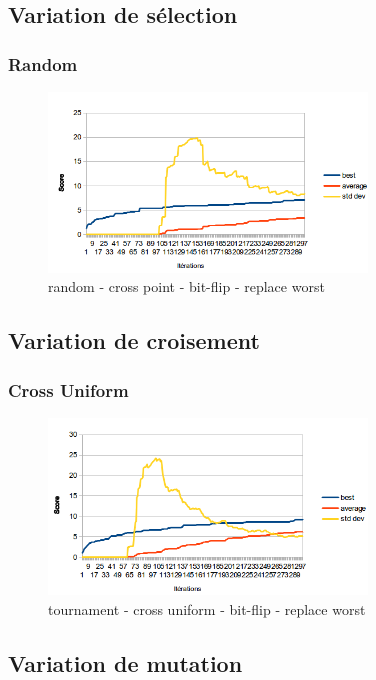 \documentclass[a4paper,10pt]{report}
\begin{document}
\subsection{Variation de sélection}
\subsubsection{Random}
\begin{figure}[h]
  \begin{center}
    \includegraphics[width=320px]{images/graph-random.png}
  \end{center}
  \caption{random - cross point - bit-flip - replace worst}
\end{figure}

\subsection{Variation de croisement}
\subsubsection{Cross Uniform}
\begin{figure}[h]
  \begin{center}
    \includegraphics[width=320px]{images/graph-cross-uniform.png}
  \end{center}
  \caption{tournament - cross uniform - bit-flip - replace worst}
\end{figure}

\pagebreak
\subsection{Variation de mutation}
\end{document}
